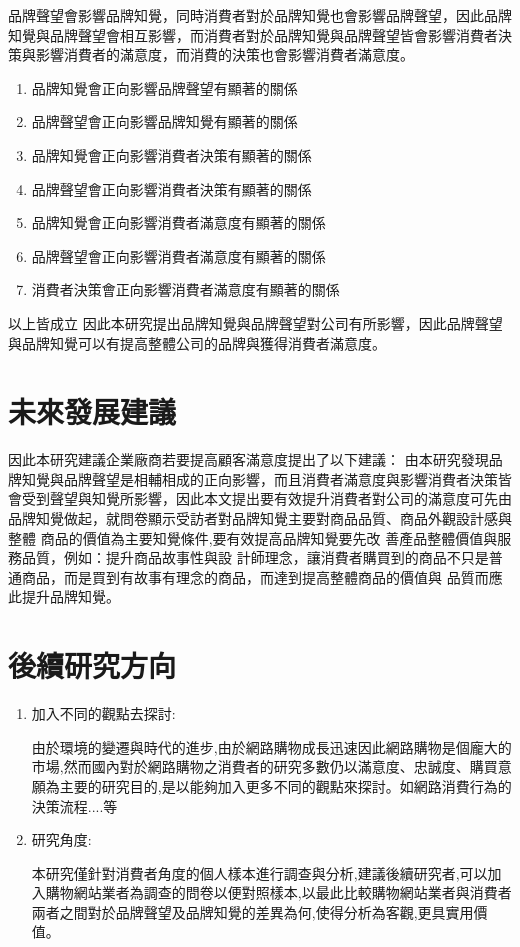 品牌聲望會影響品牌知覺，同時消費者對於品牌知覺也會影響品牌聲望，因此品牌知覺與品牌聲望會相互影響，而消費者對於品牌知覺與品牌聲望皆會影響消費者決策與影響消費者的滿意度，而消費的決策也會影響消費者滿意度。
\begin{enumerate}
\item 品牌知覺會正向影響品牌聲望有顯著的關係
\item 品牌聲望會正向影響品牌知覺有顯著的關係
\item 品牌知覺會正向影響消費者決策有顯著的關係
\item 品牌聲望會正向影響消費者決策有顯著的關係
\item 品牌知覺會正向影響消費者滿意度有顯著的關係
\item 品牌聲望會正向影響消費者滿意度有顯著的關係
\item 消費者決策會正向影響消費者滿意度有顯著的關係
\end{enumerate}
以上皆成立
因此本研究提出品牌知覺與品牌聲望對公司有所影響，因此品牌聲望與品牌知覺可以有提高整體公司的品牌與獲得消費者滿意度。


\section{未來發展建議}

因此本研究建議企業廠商若要提高顧客滿意度提出了以下建議：
由本研究發現品牌知覺與品牌聲望是相輔相成的正向影響，而且消費者滿意度與影響消費者決策皆會受到聲望與知覺所影響，因此本文提出要有效提升消費者對公司的滿意度可先由品牌知覺做起，就問卷顯示受訪者對品牌知覺主要對商品品質、商品外觀設計感與整體 商品的價值為主要知覺條件,要有效提高品牌知覺要先改 善產品整體價值與服務品質，例如：提升商品故事性與設 計師理念，讓消費者購買到的商品不只是普通商品，而是買到有故事有理念的商品，而達到提高整體商品的價值與 品質而應此提升品牌知覺。
\section{後續研究方向}
\begin{enumerate}
\item 加入不同的觀點去探討:

  由於環境的變遷與時代的進步,由於網路購物成長迅速因此網路購物是個龐大的市場,然而國內對於網路購物之消費者的研究多數仍以滿意度、忠誠度、購買意願為主要的研究目的,是以能夠加入更多不同的觀點來探討。如網路消費行為的決策流程....等

\item 研究角度:

  本研究僅針對消費者角度的個人樣本進行調查與分析,建議後續研究者,可以加入購物網站業者為調查的問卷以便對照樣本,以最此比較購物網站業者與消費者兩者之間對於品牌聲望及品牌知覺的差異為何,使得分析為客觀,更具實用價值。
\end{enumerate}
